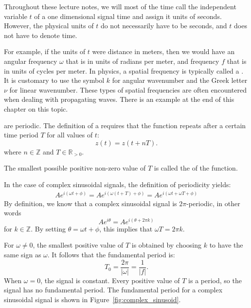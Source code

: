 Throughout these lecture notes, we will most of the time call the
independent variable $t$ of a one dimensional signal time and assign it units of seconds.
However, the physical units of $t$ do not necessarily have to be seconds, and $t$ does not have to denote time.

For example, if the units of $t$ were distance in meters,
then we would have an angular frequency $\omega$ that is in units
of radians per meter, and frequency $f$ that is in units of cycles per meter.
In physics, a spatial frequency is typically called a \emph{}.
It is customary to use the symbol $k$ for angular wavenumber and the Greek letter $\nu$ for
linear wavenumber. These types of spatial frequencies are often encountered when dealing
with propagating waves. There is an example at the end of this chapter on this topic.

 are periodic.
The definition of a  requires that the
function repeats after a certain time period $T$ for all values of $t$:
\begin{equation}
  \boxed{z(t) = z(t+ n T).}
\end{equation}
where $n \in \mathbb{Z}$ and $T \in \mathbb{R}_{>0}$.

The smallest possible positive non-zero value of $T$ is called
the \emph{} of the function.

In the case of complex sinusoidal signals, the definition of periodicity yields:
\begin{align}
  Ae^{i (\omega t + \phi)}= Ae^{i (\omega (t+T) + \phi)} = Ae^{i (\omega t+ \omega T + \phi)}
\end{align}
By definition, we know that a complex sinusoidal signal is
$2\pi$-periodic, in other words
\begin{equation}
  Ae^{i\theta}=Ae^{i(\theta+2\pi k)}
\end{equation}
for $k\in\mathbb{Z}$. By setting $\theta = \omega t +\phi$, this implies that $\omega T = 2\pi k$.

For $\omega\ne 0$, the smallest positive value of $T$ is obtained by choosing
$k$ to have the same sign as $\omega$. It follows that the fundamental period is:
\begin{equation}
  \boxed{T_0 = \frac{2\pi}{|\omega|} = \frac{1}{|f|}.}
\end{equation}
When $\omega=0$, the signal is constant. Every positive value of $T$ is a period,
so the signal has no fundamental period.
The fundamental period for a complex sinusoidal signal is shown in Figure~\ref{fig:complex_sinusoid}.


